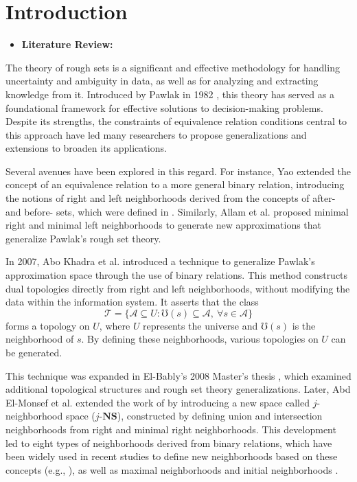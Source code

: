 \documentclass{article}
\theoremstyle{theorem}
\theoremstyle{definition}
\theoremstyle{remark}
\begin{document}
\section{Introduction}

\begin{itemize}
  \item \textbf{Literature Review:}
\end{itemize}

The theory of rough sets is a significant and effective methodology for handling uncertainty and ambiguity in data, as well as for analyzing and extracting knowledge from it. Introduced by Pawlak in 1982 \cite{Pawlak 1982}, this theory has served as a foundational framework for effective solutions to decision-making problems. Despite its strengths, the constraints of equivalence relation conditions central to this approach have led many researchers to propose generalizations and extensions to broaden its applications.

Several avenues have been explored in this regard. For instance, Yao \cite{Yao 1998} extended the concept of an equivalence relation to a more general binary relation, introducing  the notions of right and left neighborhoods derived from the concepts of after- and before- sets, which were defined in \cite{DeBaets1993}. Similarly, Allam et al. \cite{Allam2005, Allam2006} proposed minimal right and minimal left neighborhoods to generate new approximations that generalize Pawlak's rough set theory.

In 2007, Abo Khadra et al. \cite{khadra2007} introduced a technique to generalize Pawlak's approximation space through the use of binary relations. This method constructs dual topologies directly from right and left neighborhoods, without modifying the data within the information system. It asserts that the class
\[
\mathcal{T} = \{\mathcal{A} \subseteq U : \mho(s) \subseteq \mathcal{A}, \ \forall s \in \mathcal{A} \}
\]
forms a topology on \( U \), where \( U \) represents the universe and \( \mho(s) \) is the neighborhood of \( s \). By defining these neighborhoods, various topologies on \( U \) can be generated.

This technique was expanded in El-Bably's 2008 Master’s thesis \cite{El-BablyTh2008}, which examined additional topological structures and rough set theory generalizations. Later, Abd El-Monsef et al. \cite{Abd El-Monsef 2014} extended the work of \cite{khadra2007, El-BablyTh2008} by introducing a new space called $j$-neighborhood space ($j$-$\textbf{NS}$), constructed by defining union and intersection neighborhoods from right and minimal right neighborhoods. This development led to eight types of neighborhoods derived from binary relations, which have been widely used in recent studies to define new neighborhoods based on these concepts (e.g., \cite{Kaur 2024,Al-shami 2021b}), as well as maximal neighborhoods \cite{Al-shami 2021,R. A. Hosny 2021a,Hosny 2024} and initial neighborhoods \cite{RAHosny 2024}.
\end{document}
